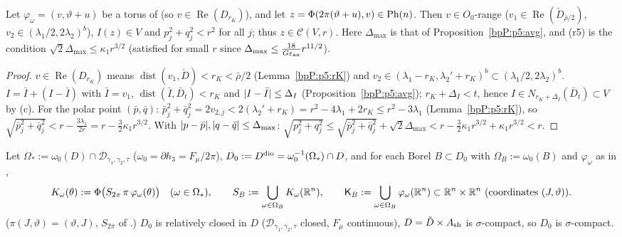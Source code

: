 \begin{lemma}\label{bpP:p5:location}
Let $\varphi_\omega=(v,\vartheta+u)$ be a torus of  (so $v\in\operatorname{Re}(D_{r_K})$), and let $z=\Phi(2\pi(\vartheta+u),v)\in\mathrm{Ph}(n)$. Then $v\in O_0$-range ($v_1\in\operatorname{Re}(\check D_{\bar\rho/2})$, $v_2\in(\lambda_1/2,2\lambda_2)^b$), $I(z)\in V$ and $p_j^2+q_j^2<r^2$ for all $j$; thus $z\in\mathcal C(V,r)$. Here $\Delta_{\max}$ is that of Proposition~\ref{bpP:p5:avg}, and (r5) is the condition $\sqrt2\Delta_{\max}\le\kappa_1r^{3/2}$ (satisfied for small $r$ since $\Delta_{\max}\le\frac{18}{G\varepsilon_{\rm an}}r^{11/2}$).
\end{lemma}
\begin{proof}
\label{stepP:p5:lo-range} $v\in\operatorname{Re}(D_{r_K})$ means $\operatorname{dist}(v_1,\check D)<r_K<\bar\rho/2$ (Lemma~\ref{bpP:p5:rK}) and $v_2\in(\lambda_1-r_K,\lambda_2'+r_K)^b\subset(\lambda_1/2,2\lambda_2)^b$.
\label{stepP:p5:lo-act} $I=\bar I+(I-\bar I)$ with $\bar I=v_1$, $\operatorname{dist}(\bar I,\bar D_t)<r_K$ and $\lvert I-\bar I\rvert\le\Delta_I$ (Proposition~\ref{bpP:p5:avg}); $r_K+\Delta_I<t$, hence $I\in N_{r_K+\Delta_I}(\bar D_t)\subset V$ by (c).
\label{stepP:p5:lo-disc} For the polar point $(\bar p,\bar q)$: $\bar p_j^2+\bar q_j^2=2v_{2,j}<2(\lambda_2'+r_K)=r^2-4\lambda_1+2r_K\le r^2-3\lambda_1$ (Lemma~\ref{bpP:p5:rK}), so $\sqrt{\bar p_j^2+\bar q_j^2}<r-\frac{3\lambda_1}{2r}=r-\frac32\kappa_1r^{3/2}$. With $\lvert p-\bar p\rvert,\lvert q-\bar q\rvert\le\Delta_{\max}$: $\sqrt{p_j^2+q_j^2}\le\sqrt{\bar p_j^2+\bar q_j^2}+\sqrt2\Delta_{\max}<r-\frac32\kappa_1r^{3/2}+\kappa_1r^{3/2}<r$.
\end{proof}

\begin{definition}\label{bpP:p5:kset}
Let $\Omega_*:=\omega_0(D)\cap\mathcal D_{\gamma_1,\gamma_2,\tau}$ ($\omega_0=\partial h_3=F_\mu/2\pi$), $D_0:=D^{\rm dio}=\omega_0^{-1}(\Omega_*)\cap D$, and for each Borel $B\subset D_0$ with $\Omega_B:=\omega_0(B)$ and $\varphi_\omega$ as in ,
\[K_\omega(\theta):=\Phi\bigl(S_{2\pi}\,\pi\,\varphi_\omega(\theta)\bigr)\quad(\omega\in\Omega_*),\qquad S_B:=\bigcup_{\omega\in\Omega_B}K_\omega(\R^n),\qquad\mathsf K_B:=\bigcup_{\omega\in\Omega_B}\varphi_\omega(\R^n)\subset\R^n\times\R^n\ \text{(coordinates }(J,\vartheta)).\]
($\pi(J,\vartheta)=(\vartheta,J)$, $S_{2\pi}$ of .) $D_0$ is relatively closed in $D$ ($\mathcal D_{\gamma_1,\gamma_2,\tau}$ closed, $F_\mu$ continuous), $D=\check D\times A_{\rm sh}$ is $\sigma$-compact, so $D_0$ is $\sigma$-compact.
\end{definition}

